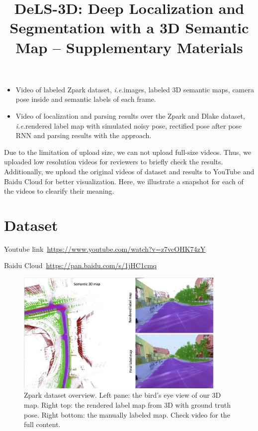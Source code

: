 \documentclass[10pt,twocolumn,letterpaper]{article}
\def\ie{\emph{i.e.}}
\begin{document}
\onecolumn
\title{DeLS-3D: Deep Localization and Segmentation with a 3D Semantic Map -- Supplementary Materials}
\maketitle

\begin{itemize}
\vspace{-0.5\baselineskip}
    \setlength{\itemsep}{-2pt}
    \item Video of labeled Zpark dataset, \ie images, labeled 3D semantic maps, camera pose inside and semantic labels of each frame.
    \item Video of localization and parsing results over the Zpark and Dlake dataset, \ie rendered label map with simulated noisy pose, rectified pose after pose RNN and parsing results with the approach.
\vspace{-0.4\baselineskip}
\end{itemize}

Due to the limitation of upload size, we can not upload full-size videos. Thus, we uploaded low resolution videos for reviewers to briefly check the results. 
Additionally, we upload the original videos of dataset and results to YouTube and Baidu Cloud for better visualization. Here, we illustrate a snapshot for each of the videos to clearify their meaning.

\section{Dataset} 
Youtube link~\url{https://www.youtube.com/watch?v=z7vcOHK74zY}

Baidu Cloud~\url{https://pan.baidu.com/s/1jHC1cmq}

\begin{figure}[!hbpt]
\center
\includegraphics[width=0.9\textwidth]{fig/dataset_video.pdf}
\caption{Zpark dataset overview. Left pane: the bird's eye view of our 3D map. Right top: the rendered label map from 3D with ground truth pose. Right bottom: the manually labeled map. Check video for the full content.}
\label{fig:framework}
\end{figure}
\end{document}
